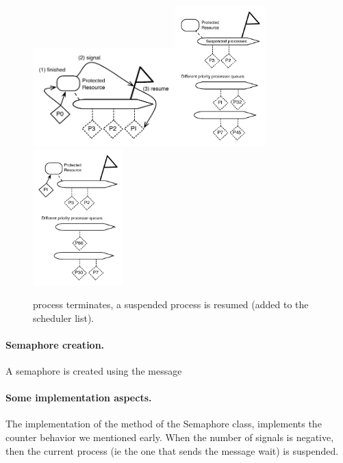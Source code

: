 \documentclass[a4paper,10pt,twoside]{book}
\begin{document}
\begin{figure}
\begin{center}
\includegraphics[width=5.5cm]{SemaphoreSendingSignal}\includegraphics[width=3.5cm]{ProcessToInSchedulerQueue}\includegraphics[width=3.5cm]{SemaphoreResuming}
\caption{  process terminates, a suspended process is resumed (added to the scheduler list).\label{fig:ProcessToInSchedulerQueue}}
\end{center}
\end{figure}




\paragraph{Semaphore creation.}
A semaphore is created using the message 




\paragraph{Some implementation aspects.} The implementation of the method  of the Semaphore class,
implements the counter behavior we mentioned early. When the number of signals is negative, then the current process (ie the one that sends the message wait) is suspended. 
\end{document}
